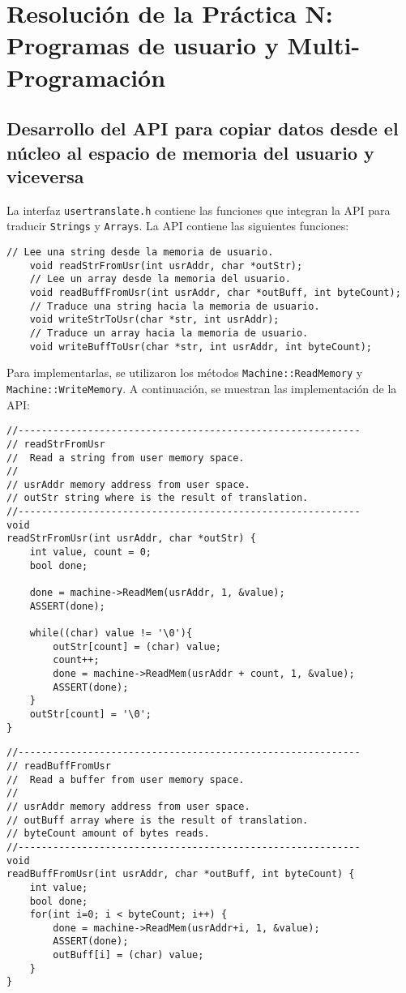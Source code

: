 \chapter{Resolución de la Práctica N: Programas de usuario y Multi-Programación}
\section{Desarrollo del API para copiar datos desde el núcleo al espacio de memoria del usuario y viceversa}
La interfaz \texttt{usertranslate.h} contiene las funciones que integran la API para traducir \texttt{Strings} y \texttt{Arrays}. La API contiene las siguientes funciones:
\begin{lstlisting}[style=C]
    // Lee una string desde la memoria de usuario.
    void readStrFromUsr(int usrAddr, char *outStr);
    // Lee un array desde la memoria del usuario.
    void readBuffFromUsr(int usrAddr, char *outBuff, int byteCount);
    // Traduce una string hacia la memoria de usuario.
    void writeStrToUsr(char *str, int usrAddr);
    // Traduce un array hacia la memoria de usuario.
    void writeBuffToUsr(char *str, int usrAddr, int byteCount);
\end{lstlisting}
Para implementarlas, se utilizaron los métodos \texttt{Machine::ReadMemory} y \texttt{Machine::WriteMemory}. A continuación, se muestran las implementación de la API:
\begin{lstlisting}[style=C]
//-----------------------------------------------------------
// readStrFromUsr
//  Read a string from user memory space.
//
// usrAddr memory address from user space.
// outStr string where is the result of translation.
//-----------------------------------------------------------
void
readStrFromUsr(int usrAddr, char *outStr) {
    int value, count = 0;
    bool done;
   
    done = machine->ReadMem(usrAddr, 1, &value);
    ASSERT(done);
                
    while((char) value != '\0'){
        outStr[count] = (char) value;
        count++;
        done = machine->ReadMem(usrAddr + count, 1, &value);
        ASSERT(done);
    }
    outStr[count] = '\0';
}
\end{lstlisting}
\begin{lstlisting}[style=C]
//-----------------------------------------------------------
// readBuffFromUsr
//  Read a buffer from user memory space.
//
// usrAddr memory address from user space.
// outBuff array where is the result of translation.
// byteCount amount of bytes reads.
//-----------------------------------------------------------
void
readBuffFromUsr(int usrAddr, char *outBuff, int byteCount) {
    int value;
    bool done;
    for(int i=0; i < byteCount; i++) {
        done = machine->ReadMem(usrAddr+i, 1, &value);
        ASSERT(done);
        outBuff[i] = (char) value;
    }
}
\end{lstlisting}
